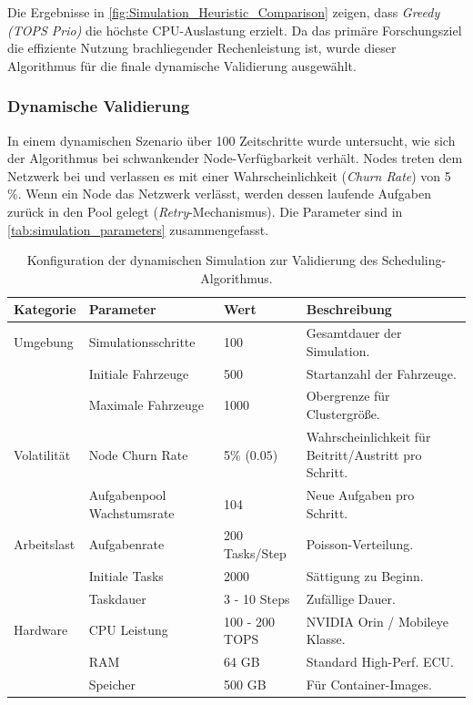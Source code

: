 Die Ergebnisse in \autoref{fig:Simulation_Heuristic_Comparison} zeigen, dass \textit{Greedy (TOPS Prio)} die höchste CPU-Auslastung erzielt. Da das primäre Forschungsziel die effiziente Nutzung brachliegender Rechenleistung ist, wurde dieser Algorithmus für die finale dynamische Validierung ausgewählt.

\subsubsection{Dynamische Validierung}
In einem dynamischen Szenario über 100 Zeitschritte wurde untersucht, wie sich der Algorithmus bei schwankender Node-Verfügbarkeit verhält. Nodes treten dem Netzwerk bei und verlassen es mit einer Wahrscheinlichkeit (\textit{Churn Rate}) von 5\,\%. Wenn ein Node das Netzwerk verlässt, werden dessen laufende Aufgaben zurück in den Pool gelegt (\textit{Retry}-Mechanismus). Die Parameter sind in \autoref{tab:simulation_parameters} zusammengefasst.

\begin{table}[htbp]
    \centering
    \begin{tabular}{m{2.5cm} m{3.5cm} m{3cm} m{5cm}}
        \toprule
        \textbf{Kategorie} & \textbf{Parameter} & \textbf{Wert} & \textbf{Beschreibung} \\
        \midrule
        Umgebung & Simulationsschritte & 100 & Gesamtdauer der Simulation. \\
         & Initiale Fahrzeuge & 500 & Startanzahl der Fahrzeuge. \\
         & Maximale Fahrzeuge & 1000 & Obergrenze für Clustergröße. \\
        \midrule
        Volatilität & Node Churn Rate & 5\% ($0.05$) & Wahrscheinlichkeit für Beitritt/Austritt pro Schritt. \\
        & Aufgabenpool Wachstumsrate & 104 & Neue Aufgaben pro Schritt. \\
        \midrule
        Arbeitslast & Aufgabenrate & 200 Tasks/Step & Poisson-Verteilung. \\
         & Initiale Tasks & 2000 & Sättigung zu Beginn. \\
         & Taskdauer & 3 - 10 Steps & Zufällige Dauer. \\
        \midrule
        Hardware & CPU Leistung & 100 - 200 TOPS & NVIDIA Orin / Mobileye Klasse. \\
         & RAM & 64 GB & Standard High-Perf. ECU. \\
         & Speicher & 500 GB & Für Container-Images. \\
        \bottomrule
    \end{tabular} 
    \caption{Konfiguration der dynamischen Simulation zur Validierung des Scheduling-Algorithmus.}
    \label{tab:simulation_parameters}
\end{table}

